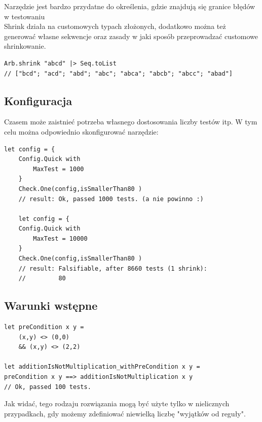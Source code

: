 Narzędzie jest bardzo przydatne do określenia, gdzie znajdują się granice błędów w testowaniu\\
Shrink działa na customowych typach złożonych, dodatkowo można też generować własne sekwencje oraz zasady w jaki sposób przeprowadzać customowe shrinkowanie. 

\lstset{language=FSharp, basicstyle=\scriptsize}
\begin{lstlisting}[frame=single,caption={Shrinkowanie ciągu znaków},label=kod:listingA]
Arb.shrink "abcd" |> Seq.toList
// ["bcd"; "acd"; "abd"; "abc"; "abca"; "abcb"; "abcc"; "abad"]
\end{lstlisting}

\subsection{Konfiguracja}
Czasem może zaistnieć potrzeba własnego dostosowania liczby testów itp. W tym celu można odpowiednio skonfigurować narzędzie:
\lstset{language=FSharp, basicstyle=\scriptsize}
\begin{lstlisting}[frame=single,caption={Dostosowanie konfiguracji testów},label=kod:listingA]
let config = {
    Config.Quick with
        MaxTest = 1000
    }
    Check.One(config,isSmallerThan80 )
    // result: Ok, passed 1000 tests. (a nie powinno :)
    
    let config = {
    Config.Quick with
        MaxTest = 10000
    }
    Check.One(config,isSmallerThan80 )
    // result: Falsifiable, after 8660 tests (1 shrink):
    //         80
\end{lstlisting}

\subsection{Warunki wstępne}
\lstset{language=FSharp, basicstyle=\scriptsize}
\begin{lstlisting}[frame=single,caption={Dodawanie warunków wstępnych},label=kod:listingA]
let preCondition x y =
    (x,y) <> (0,0)
    && (x,y) <> (2,2)

let additionIsNotMultiplication_withPreCondition x y =
preCondition x y ==> additionIsNotMultiplication x y
// Ok, passed 100 tests.
\end{lstlisting}

Jak widać, tego rodzaju rozwiązania mogą być użyte tylko w nielicznych przypadkach, gdy możemy zdefiniować niewielką liczbę "wyjątków od reguły".

